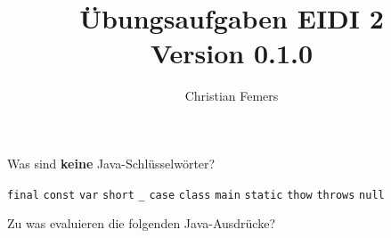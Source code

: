 \documentclass[11pt]{exam} %
\title{Übungsaufgaben EIDI 2 \\ \small \color{magenta}Version 0.1.0}
\author{Christian Femers}
\newcommand{\code}[1]{\texttt|#1|}
\begin{document}
\maketitle

\begin{questions}
\question Was sind \textbf{keine} Java-Schlüsselwörter?
\begin{checkboxes}
\choice \texttt{final}
\CorrectChoice \texttt{const}
\CorrectChoice \texttt{var}
\choice \texttt{short}
\CorrectChoice \texttt{\_}
\choice \texttt{case}
\choice \texttt{class}
\CorrectChoice \texttt{main}
\choice \texttt{static}
\choice \texttt{thow}
\choice \texttt{throws}
\CorrectChoice \texttt{null}
\end{checkboxes}
\question Zu was evaluieren die folgenden Java-Ausdrücke? 
\end{questions}
\end{document}
